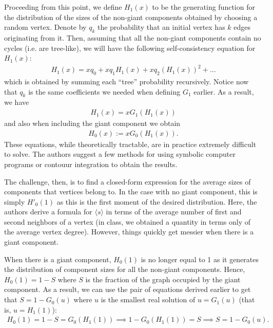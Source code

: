 \documentclass{letter}
\newcounter{solution}
\begin{document}
{    Proceeding from this point, we define $H_1(x)$ to be the generating function for the distribution of the sizes of the non-giant components obtained by choosing a random vertex. Denote by $q_k$ the probability that an initial vertex has $k$ edges originating from it. Then, assuming that all the non-giant components contain no cycles (i.e. are tree-like), we will have the following self-consistency equation for $H_1(x)$: \begin{align*}
        H_1(x) = xq_0 + xq_1H_1(x) + xq_2(H_1(x))^2 + \dots 
    \end{align*} which is obtained by summing each ``tree'' probability recursively. Notice now that $q_k$ is the same coefficients we needed when defining $G_1$ earlier. As a result, we have \begin{align*}
        H_1(x) = xG_1(H_1(x))
    \end{align*} and also when including the giant component we obtain \begin{align*}
        H_0(x) := xG_0(H_1(x)).
    \end{align*} These equations, while theoretically tractable, are in practice extremely difficult to solve. The authors suggest a few methods for using symbolic computer programs or contouur integration to obtain the results.
    
    The challenge, then, is to find a closed-form expression for the average sizes of components that vertices belong to. In the case with no giant component, this is simply $H'_0(1)$ as this is the first moment of the desired distribution. Here, the authors derive a formula for $\langle s \rangle$ in terms of the average number of first and second neighbors of a vertex (in class, we obtained a quantity in terms only of the average vertex degree). However, things quickly get messier when there is a giant component. 
    
    When there is a giant component, $H_0(1)$ is no longer equal to 1 as it generates the distribution of component sizes for all the non-giant components. Hence, $H_0(1) = 1 - S$ where $S$ is the fraction of the graph occupied by the giant component. As a result, we can use the pair of equations derived earlier to get that $S = 1 - G_0(u)$ where $u$ is the smallest real solution of $u = G_1(u)$ (that is, $u = H_1(1)$): \begin{align*}
        H_0(1) = 1 - S = G_0(H_1(1)) \implies 1 - G_0(H_1(1)) = S \implies S = 1 - G_0(u).
    \end{align*}
    
}
\end{document}
